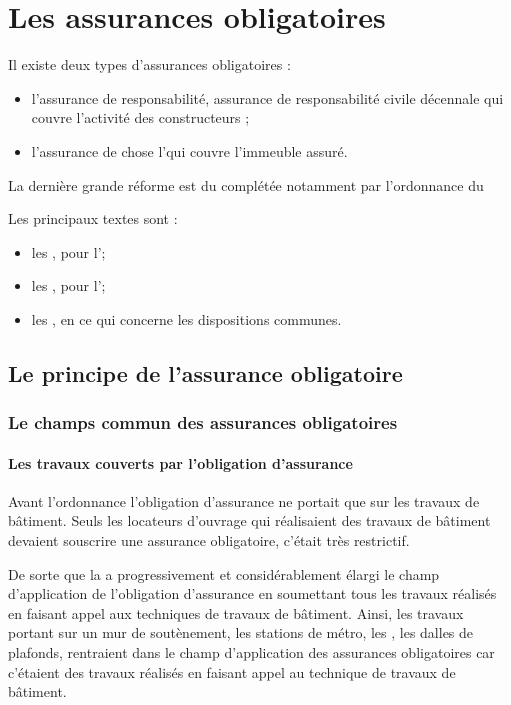 
\chapter{Les assurances obligatoires}

	Il existe deux types d'assurances obligatoires :
	\begin{itemize}
		\item l'assurance de responsabilité, assurance de responsabilité civile décennale qui couvre l’activité des constructeurs ;
		\item l'assurance de chose l'\ado qui couvre l’immeuble assuré.
	\end{itemize}

	\medbreak La dernière grande réforme est du  complétée notamment par l'ordonnance du 

	\medbreak Les principaux textes sont :
	\begin{itemize}
		\item les , pour l'\arcd ;
		\item les , pour l'\ado ;
		\item les , en ce qui concerne les dispositions communes.
	\end{itemize}


\section{Le principe de l'assurance obligatoire}

	\subsection{Le champs commun des assurances obligatoires}


		\subsubsection{Les travaux couverts par l'obligation d'assurance}

			Avant l'ordonnance  l'obligation d'assurance ne portait que sur les travaux de bâtiment.
			Seuls les locateurs d’ouvrage qui réalisaient des travaux de bâtiment devaient souscrire une assurance obligatoire, c’était très restrictif.

			De sorte que la \JP a progressivement et considérablement élargi le champ d’application de l’obligation d’assurance en soumettant tous les travaux réalisés en faisant appel aux techniques de travaux de bâtiment.
			Ainsi, les travaux portant sur un mur de soutènement, les stations de métro, les \vrd, les dalles de plafonds, \etc rentraient dans le champ d’application des assurances obligatoires car c’étaient des travaux réalisés en faisant appel au technique de travaux de bâtiment.

